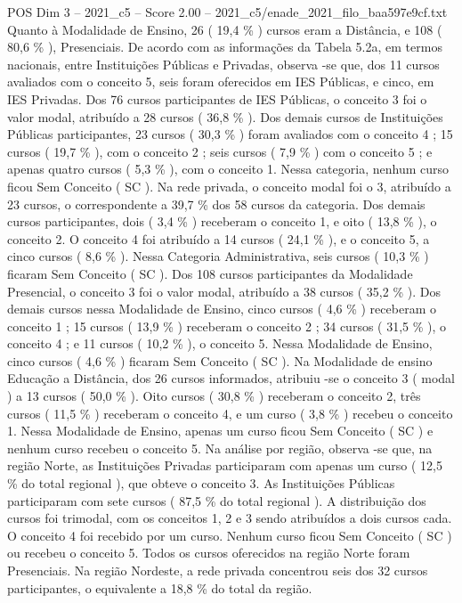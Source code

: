 \begin{textsample}{POS Dim 3 – 2021\_c5 – Score 2.00 – 2021\_c5/enade\_2021\_filo\_baa597e9cf.txt}
Quanto à Modalidade de Ensino, 26 ( 19,4 \% ) cursos eram a Distância, e 108 ( 80,6 \% ), Presenciais.
De acordo com as informações da Tabela 5.2a, em termos nacionais, entre Instituições Públicas e Privadas, observa -se que, dos 11 cursos avaliados com o conceito 5, seis foram oferecidos em IES Públicas, e cinco, em IES Privadas.
Dos 76 cursos participantes de IES Públicas, o conceito 3 foi o valor modal, atribuído a 28 cursos ( 36,8 \% ).
Dos demais cursos de Instituições Públicas participantes, 23 cursos ( 30,3 \% ) foram avaliados com o conceito 4 ; 15 cursos ( 19,7 \% ), com o conceito 2 ; seis cursos ( 7,9 \% ) com o conceito 5 ; e apenas quatro cursos ( 5,3 \% ), com o conceito 1.
Nessa categoria, nenhum curso ficou Sem Conceito ( SC ).
Na rede privada, o conceito modal foi o 3, atribuído a 23 cursos, o correspondente a 39,7 \% dos 58 cursos da categoria.
Dos demais cursos participantes, dois ( 3,4 \% ) receberam o conceito 1, e oito ( 13,8 \% ), o conceito 2.
O conceito 4 foi atribuído a 14 cursos ( 24,1 \% ), e o conceito 5, a cinco cursos ( 8,6 \% ).
Nessa Categoria Administrativa, seis cursos ( 10,3 \% ) ficaram Sem Conceito ( SC ).
Dos 108 cursos participantes da Modalidade Presencial, o conceito 3 foi o valor modal, atribuído a 38 cursos ( 35,2 \% ).
Dos demais cursos nessa Modalidade de Ensino, cinco cursos ( 4,6 \% ) receberam o conceito 1 ; 15 cursos ( 13,9 \% ) receberam o conceito 2 ; 34 cursos ( 31,5 \% ), o conceito 4 ; e 11 cursos ( 10,2 \% ), o conceito 5.
Nessa Modalidade de Ensino, cinco cursos ( 4,6 \% ) ficaram Sem Conceito ( SC ).
Na Modalidade de ensino Educação a Distância, dos 26 cursos informados, atribuiu -se o conceito 3 ( modal ) a 13 cursos ( 50,0 \% ).
Oito cursos ( 30,8 \% ) receberam o conceito 2, três cursos ( 11,5 \% ) receberam o conceito 4, e um curso ( 3,8 \% ) recebeu o conceito 1.
Nessa Modalidade de Ensino, apenas um curso ficou Sem Conceito ( SC ) e nenhum curso recebeu o conceito 5.
Na análise por região, observa -se que, na região Norte, as Instituições Privadas participaram com apenas um curso ( 12,5 \% do total regional ), que obteve o conceito 3.
As Instituições Públicas participaram com sete cursos ( 87,5 \% do total regional ).
A distribuição dos cursos foi trimodal, com os conceitos 1, 2 e 3 sendo atribuídos a dois cursos cada.
O conceito 4 foi recebido por um curso.
Nenhum curso ficou Sem Conceito ( SC ) ou recebeu o conceito 5.
Todos os cursos oferecidos na região Norte foram Presenciais.
Na região Nordeste, a rede privada concentrou seis dos 32 cursos participantes, o equivalente a 18,8 \% do total da região.

\end{textsample}

